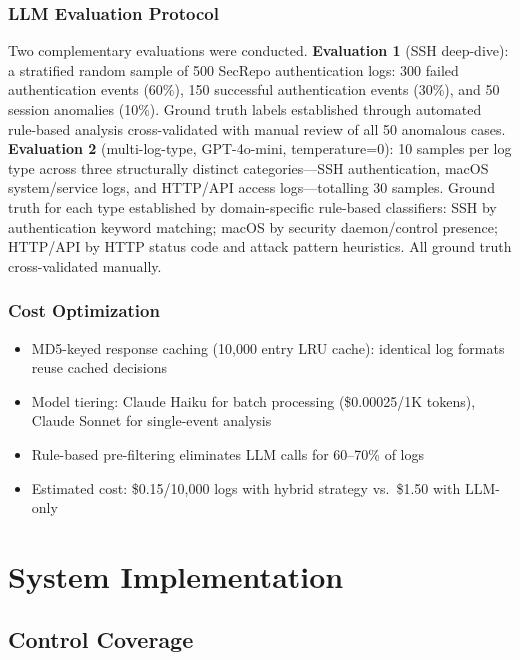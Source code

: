 \documentclass[11pt,conference]{IEEEtran}
\begin{document}
\subsubsection{LLM Evaluation Protocol}

Two complementary evaluations were conducted. \textbf{Evaluation 1} (SSH deep-dive): a stratified random sample of 500 SecRepo authentication logs: 300 failed authentication events (60\%), 150 successful authentication events (30\%), and 50 session anomalies (10\%). Ground truth labels established through automated rule-based analysis cross-validated with manual review of all 50 anomalous cases. \textbf{Evaluation 2} (multi-log-type, GPT-4o-mini, temperature=0): 10 samples per log type across three structurally distinct categories---SSH authentication, macOS system/service logs, and HTTP/API access logs---totalling 30 samples. Ground truth for each type established by domain-specific rule-based classifiers: SSH by authentication keyword matching; macOS by security daemon/control presence; HTTP/API by HTTP status code and attack pattern heuristics. All ground truth cross-validated manually.

\subsubsection{Cost Optimization}

\begin{itemize}
    \item MD5-keyed response caching (10,000 entry LRU cache): identical log formats reuse cached decisions
    \item Model tiering: Claude Haiku for batch processing (\$0.00025/1K tokens), Claude Sonnet for single-event analysis
    \item Rule-based pre-filtering eliminates LLM calls for 60--70\% of logs
    \item Estimated cost: \$0.15/10,000 logs with hybrid strategy vs.\ \$1.50 with LLM-only
\end{itemize}

\section{System Implementation}

\subsection{Control Coverage}
\end{document}
